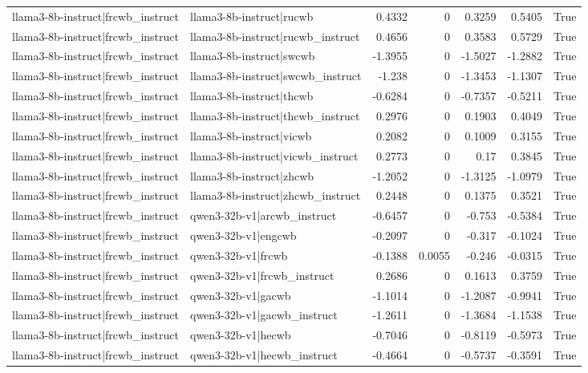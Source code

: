 \begin{table}
\begin{tabular}{l l r r r r l}
llama3-8b-instruct|frcwb_instruct & llama3-8b-instruct|rucwb & 0.4332 & 0 & 0.3259 & 0.5405 & True \\
llama3-8b-instruct|frcwb_instruct & llama3-8b-instruct|rucwb_instruct & 0.4656 & 0 & 0.3583 & 0.5729 & True \\
llama3-8b-instruct|frcwb_instruct & llama3-8b-instruct|swcwb & -1.3955 & 0 & -1.5027 & -1.2882 & True \\
llama3-8b-instruct|frcwb_instruct & llama3-8b-instruct|swcwb_instruct & -1.238 & 0 & -1.3453 & -1.1307 & True \\
llama3-8b-instruct|frcwb_instruct & llama3-8b-instruct|thcwb & -0.6284 & 0 & -0.7357 & -0.5211 & True \\
llama3-8b-instruct|frcwb_instruct & llama3-8b-instruct|thcwb_instruct & 0.2976 & 0 & 0.1903 & 0.4049 & True \\
llama3-8b-instruct|frcwb_instruct & llama3-8b-instruct|vicwb & 0.2082 & 0 & 0.1009 & 0.3155 & True \\
llama3-8b-instruct|frcwb_instruct & llama3-8b-instruct|vicwb_instruct & 0.2773 & 0 & 0.17 & 0.3845 & True \\
llama3-8b-instruct|frcwb_instruct & llama3-8b-instruct|zhcwb & -1.2052 & 0 & -1.3125 & -1.0979 & True \\
llama3-8b-instruct|frcwb_instruct & llama3-8b-instruct|zhcwb_instruct & 0.2448 & 0 & 0.1375 & 0.3521 & True \\
llama3-8b-instruct|frcwb_instruct & qwen3-32b-v1|arcwb_instruct & -0.6457 & 0 & -0.753 & -0.5384 & True \\
llama3-8b-instruct|frcwb_instruct & qwen3-32b-v1|engcwb & -0.2097 & 0 & -0.317 & -0.1024 & True \\
llama3-8b-instruct|frcwb_instruct & qwen3-32b-v1|frcwb & -0.1388 & 0.0055 & -0.246 & -0.0315 & True \\
llama3-8b-instruct|frcwb_instruct & qwen3-32b-v1|frcwb_instruct & 0.2686 & 0 & 0.1613 & 0.3759 & True \\
llama3-8b-instruct|frcwb_instruct & qwen3-32b-v1|gacwb & -1.1014 & 0 & -1.2087 & -0.9941 & True \\
llama3-8b-instruct|frcwb_instruct & qwen3-32b-v1|gacwb_instruct & -1.2611 & 0 & -1.3684 & -1.1538 & True \\
llama3-8b-instruct|frcwb_instruct & qwen3-32b-v1|hecwb & -0.7046 & 0 & -0.8119 & -0.5973 & True \\
llama3-8b-instruct|frcwb_instruct & qwen3-32b-v1|hecwb_instruct & -0.4664 & 0 & -0.5737 & -0.3591 & True \\

\end{tabular}
\end{table}
